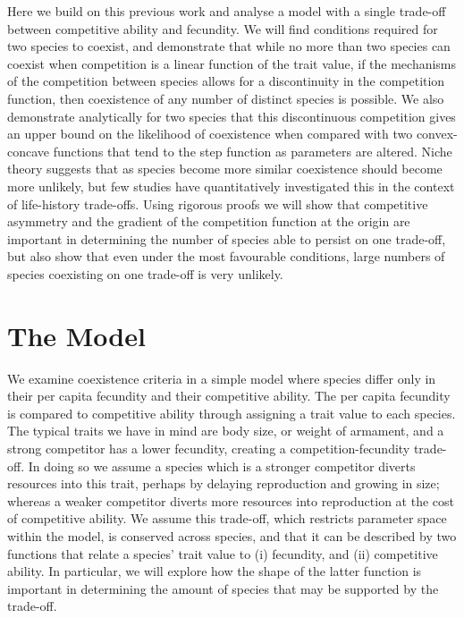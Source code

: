 Here we build on this  previous work and analyse a model with a single trade-off between competitive ability and fecundity. We will find conditions required for two species to coexist, and demonstrate that while no more than two species can coexist when competition is a linear function of the trait value, if the mechanisms of the competition between species allows for a discontinuity in the competition function, then coexistence of any number of distinct species is possible. We also demonstrate analytically for two species that this discontinuous competition gives an upper bound on the likelihood of coexistence when compared with two convex-concave functions that tend to the step function as parameters are altered. Niche theory suggests that as species become more similar coexistence should become more unlikely, but few studies have quantitatively investigated this in the context of life-history trade-offs. Using rigorous proofs we will show that competitive asymmetry and the gradient of the competition function at the origin are important in determining the number of species able to persist on one trade-off, but also show that even under the most favourable conditions, large numbers of species coexisting on one trade-off is very unlikely.
 
\section{The Model}

We examine coexistence criteria in a simple model where species differ only in their per capita fecundity and their competitive ability. The per capita fecundity is compared to competitive ability through assigning a trait value to each species. The typical traits we have in mind are body size, or weight of armament, and a strong competitor has a lower fecundity, creating a competition-fecundity trade-off. In doing so we assume a species which is a stronger competitor diverts resources into this trait, perhaps by delaying reproduction and growing in size; whereas a weaker competitor diverts more resources into reproduction at the cost of competitive ability. We assume this trade-off, which restricts parameter space within the model, is conserved across species, and that it can be described by two functions that relate a species' trait value to (i) fecundity, and (ii) competitive ability. In particular, we will explore how the shape of the latter function is important in determining the amount of species that may be supported by the trade-off.


